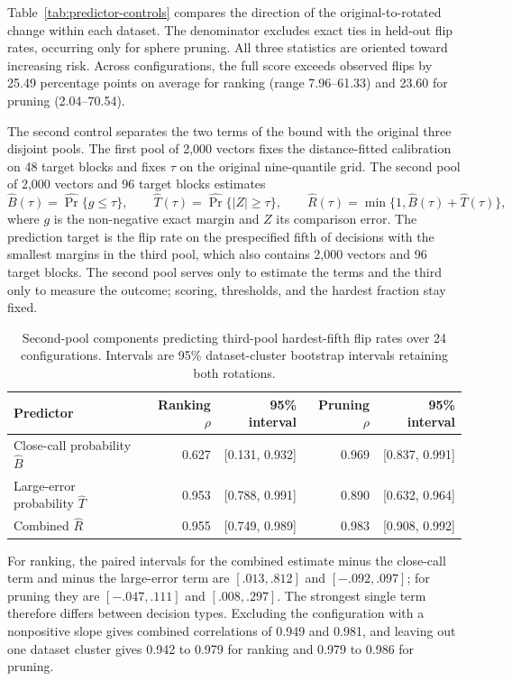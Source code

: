 Table~\ref{tab:predictor-controls} compares the direction of the original-to-rotated change within each dataset. The denominator excludes exact ties in held-out flip rates, occurring only for sphere pruning. All three statistics are oriented toward increasing risk. Across configurations, the full score exceeds observed flips by 25.49 percentage points on average for ranking (range 7.96--61.33) and 23.60 for pruning (2.04--70.54).



The second control separates the two terms of the bound with the original three disjoint pools. The first pool of 2{,}000 vectors fixes the distance-fitted calibration on 48 target blocks and fixes $\tau$ on the original nine-quantile grid. The second pool of 2{,}000 vectors and 96 target blocks estimates
\[
\widehat B(\tau)=\widehat{\Pr}\{g\le\tau\},\qquad
\widehat T(\tau)=\widehat{\Pr}\{|Z|\ge\tau\},\qquad
\widehat R(\tau)=\min\{1,\widehat B(\tau)+\widehat T(\tau)\},
\]
where $g$ is the non-negative exact margin and $Z$ its comparison error. The prediction target is the flip rate on the prespecified fifth of decisions with the smallest margins in the third pool, which also contains 2{,}000 vectors and 96 target blocks. The second pool serves only to estimate the terms and the third only to measure the outcome; scoring, thresholds, and the hardest fraction stay fixed.

\begin{table}[tbp]
\centering


\small
\begin{tabular}{lrrrr}
\toprule
Predictor & Ranking $\rho$ & 95\% interval & Pruning $\rho$ & 95\% interval \\
\midrule
Close-call probability $\widehat B$ & 0.627 & [0.131, 0.932] & 0.969 & [0.837, 0.991] \\
Large-error probability $\widehat T$ & 0.953 & [0.788, 0.991] & 0.890 & [0.632, 0.964] \\
Combined $\widehat R$ & 0.955 & [0.749, 0.989] & 0.983 & [0.908, 0.992] \\
\bottomrule
\end{tabular}

\small
\caption{Second-pool components predicting third-pool hardest-fifth flip rates over 24 configurations. Intervals are 95\% dataset-cluster bootstrap intervals retaining both rotations.}
\label{tab:app-direct-components}
\end{table}

For ranking, the paired intervals for the combined estimate minus the close-call term and minus the large-error term are $[.013,.812]$ and $[-.092,.097]$; for pruning they are $[-.047,.111]$ and $[.008,.297]$. The strongest single term therefore differs between decision types. Excluding the configuration with a nonpositive slope gives combined correlations of 0.949 and 0.981, and leaving out one dataset cluster gives 0.942 to 0.979 for ranking and 0.979 to 0.986 for pruning.

